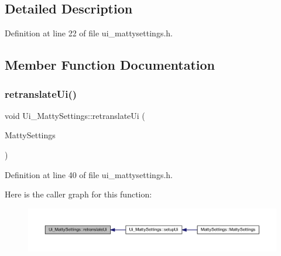 \subsection{Detailed Description}


Definition at line 22 of file ui\+\_\+mattysettings.\+h.



\subsection{Member Function Documentation}
\hypertarget{classUi__MattySettings_aab5e7bc10516f3837b1c4e5cd33b9a76}{}\label{classUi__MattySettings_aab5e7bc10516f3837b1c4e5cd33b9a76} 
\subsubsection{\texorpdfstring{retranslate\+Ui()}{retranslateUi()}}
{\footnotesize\ttfamily void Ui\+\_\+\+Matty\+Settings\+::retranslate\+Ui (\begin{DoxyParamCaption}\item[{Q\+Widget $\ast$}]{Matty\+Settings }\end{DoxyParamCaption})\hspace{0.3cm}{\ttfamily [inline]}}



Definition at line 40 of file ui\+\_\+mattysettings.\+h.

Here is the caller graph for this function\+:
\nopagebreak
\begin{figure}[H]
\begin{center}
\leavevmode
\includegraphics[width=350pt]{classUi__MattySettings_aab5e7bc10516f3837b1c4e5cd33b9a76_icgraph}
\end{center}
\end{figure}
\hypertarget{classUi__MattySettings_aa5a49194b05cc0f4d7f06d99f18e253e}{}\label{classUi__MattySettings_aa5a49194b05cc0f4d7f06d99f18e253e} 
